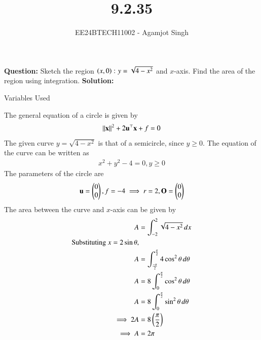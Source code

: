 \documentclass[journal]{IEEEtran}
\begin{document}

\vspace{3cm}

\title{9.2.35}
\author{EE24BTECH11002 - Agamjot Singh}
{\let\newpage\relax\maketitle}

\renewcommand{\thefigure}{\theenumi}
\renewcommand{\thetable}{\theenumi}
\setlength{\intextsep}{10pt} %

\textbf{Question:}
\newline
Sketch the region $\left(x, 0\right) \colon y = \sqrt{4 - x^2}$ and $x$-axis. Find the area of the region using integration.
\newline
\textbf{Solution:}

\begin{table}[h!]
	\centering
	
	\caption{Variables Used}
	\label{tab9.2.35}
\end{table}

The general equation of a circle is given by 
\begin{align}
	\left\lVert\mathbf{x}\right\rVert^2 + 2\mathbf{u}^\top\mathbf{x} + f = 0
\end{align}
The given curve $y = \sqrt{4 - x^2}$ is that of a semicircle, since $y \geq 0$.
\newline
The equation of the curve can be written as
\begin{align}
	x^2 + y^2 - 4 = 0, y \geq 0
\end{align}
The parameters of the circle are
\begin{align}
	\mathbf{u} = \begin{pmatrix}0\\0\end{pmatrix}, f = -4 \implies r = 2, \mathbf{O} = \begin{pmatrix}0\\0\end{pmatrix}
\end{align}
The area between the curve and $x$-axis can be given by
\begin{align}
	A &= \int_{-2}^{2} \sqrt{4 - x^2} \, dx\\
	\text{Substituting } x = 2\sin{\theta} \text{,}\\
	A &= \int_{\frac{-\pi}{2}}^{\frac{\pi}{2}} 4\cos^2{\theta} \, d\theta\\
	A &= 8\int_{0}^{\frac{\pi}{2}} \cos^2{\theta} \, d\theta\\
	A &= 8\int_{0}^{\frac{\pi}{2}} \sin^2{\theta} \, d\theta\\
	\implies 2A &= 8\left(\frac{\pi}{2}\right)\\
	\implies A &= 2\pi
\end{align}
\end{document}

